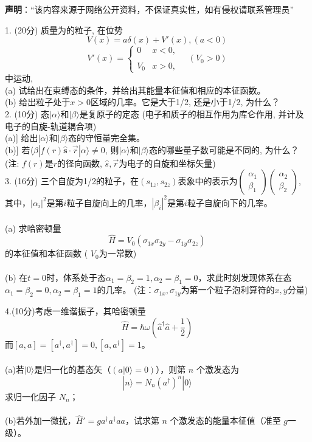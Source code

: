 
\textbf{声明}：“该内容来源于网络公开资料，不保证真实性，如有侵权请联系管理员”

1. (20分) 质量为的粒子, 在位势
$$V(x) = a \delta (x) + V'(x), (a < 0)~$$
$$V'(x) = \begin{cases} 0 & x < 0, \\\\ V_0 & x > 0,\end{cases}\quad (V_0 > 0)~$$
中运动,\\
(a) 试给出在束缚态的条件，并给出其能量本征值和相应的本征函数。\\
(b) 给出粒子处于$ x > 0 $区域的几率。它是大于1/2, 还是小于1/2, 为什么？\\

2. (10分) 态$|\alpha\rangle$和$|\beta\rangle$是复原子的定态 (电子和质子的相互作用为库仑作用, 并计及电子的自旋-轨道耦合项)\\
(a)] 给出$|\alpha\rangle$和$|\beta\rangle$态的守恒量完全集。\\
(b)] 若$\langle \beta | f({r}) \hat{\mathbf{s}} \cdot \vec{r} | \alpha \rangle \neq 0$, 则$|\alpha\rangle$和$|\beta\rangle$态的哪些量子数可能是不同的, 为什么？\\
(注: $f({r})$是$r$的径向函数, $\hat{s},\vec{r}$为电子的自旋和坐标矢量)\\

3. (16分) 三个自旋为1/2的粒子，在$(s_{1z}, s_{2z})$表象中的表示为$\begin{pmatrix} \alpha_1 \\ \beta_1 \end{pmatrix} \begin{pmatrix} \alpha_2 \\ \beta_2 \end{pmatrix}$, 其中，$\left|\alpha_i\right|^2$是第$i$粒子自旋向上的几率，$\left|\beta_i\right|^2$是第$i$粒子自旋向下的几率。\\\\
(a) 求哈密顿量 
$$\hat{H} = V_0 (\sigma_{1x} \sigma_{2y} - \sigma_{1y} \sigma_{2z})~$$
    的本征值和本征函数 ( $V_0$为一常数)\\\\
(b) 在$t=0$时，体系处于态$\alpha_1 = \beta_2 = 1, \alpha_2 = \beta_1 = 0$，求此时刻发现体系在态$\alpha_1 = \beta_2 = 0, \alpha_2 = \beta_1 = 1$的几率。
    (注：$\sigma_{1x}, \sigma_{1y}$为第一个粒子泡利算符的$x,y$分量)

4.(10分)考虑一维谐振子，其哈密顿量
$$\hat{H} = \hbar \omega \left( \hat{a}^\dagger \hat{a} + \frac{1}{2} \right)~$$
    而$[a, a] = [a^\dagger, a^\dagger] = 0, [a, a^\dagger] = 1$。\\\\
(a)若$|0\rangle$是归一化的基态矢（$(a|0\rangle = 0)$），则第 $n$ 个激发态为
$$|n\rangle = N_n (a^\dagger)^n |0\rangle~$$
        求归一化因子 $N_n$；\\\\
(b)若外加一微扰，$\hat{H}' = g a^\dagger a^\dagger a a$，试求第 $n$ 个激发态的能量本征值（准至 $g$一级）。

